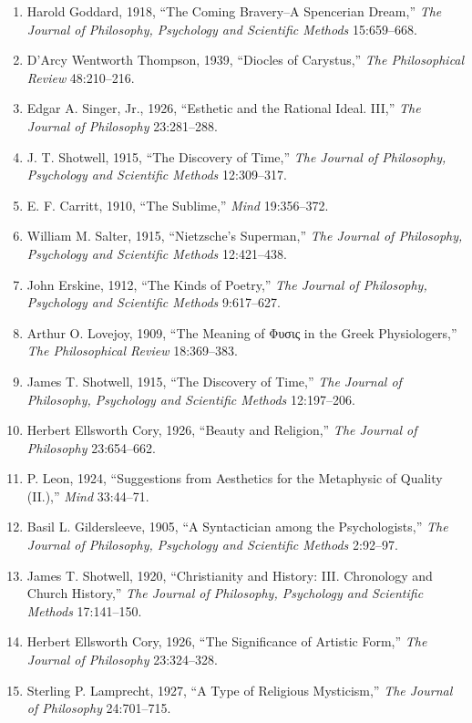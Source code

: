 \documentclass[
]{article}
\begin{document}
\begin{enumerate}
\def\labelenumi{\arabic{enumi}.}
\item
  Harold Goddard, 1918, ``The Coming Bravery--A Spencerian Dream,''
  \emph{The Journal of Philosophy, Psychology and Scientific Methods}
  15:659--668.
\item
  D'Arcy Wentworth Thompson, 1939, ``Diocles of Carystus,'' \emph{The
  Philosophical Review} 48:210--216.
\item
  Edgar A. Singer, Jr., 1926, ``Esthetic and the Rational Ideal. III,''
  \emph{The Journal of Philosophy} 23:281--288.
\item
  J. T. Shotwell, 1915, ``The Discovery of Time,'' \emph{The Journal of
  Philosophy, Psychology and Scientific Methods} 12:309--317.
\item
  E. F. Carritt, 1910, ``The Sublime,'' \emph{Mind} 19:356--372.
\item
  William M. Salter, 1915, ``Nietzsche's Superman,'' \emph{The Journal
  of Philosophy, Psychology and Scientific Methods} 12:421--438.
\item
  John Erskine, 1912, ``The Kinds of Poetry,'' \emph{The Journal of
  Philosophy, Psychology and Scientific Methods} 9:617--627.
\item
  Arthur O. Lovejoy, 1909, ``The Meaning of Φυσις in the Greek
  Physiologers,'' \emph{The Philosophical Review} 18:369--383.
\item
  James T. Shotwell, 1915, ``The Discovery of Time,'' \emph{The Journal
  of Philosophy, Psychology and Scientific Methods} 12:197--206.
\item
  Herbert Ellsworth Cory, 1926, ``Beauty and Religion,'' \emph{The
  Journal of Philosophy} 23:654--662.
\item
  P. Leon, 1924, ``Suggestions from Aesthetics for the Metaphysic of
  Quality (II.),'' \emph{Mind} 33:44--71.
\item
  Basil L. Gildersleeve, 1905, ``A Syntactician among the
  Psychologists,'' \emph{The Journal of Philosophy, Psychology and
  Scientific Methods} 2:92--97.
\item
  James T. Shotwell, 1920, ``Christianity and History: III. Chronology
  and Church History,'' \emph{The Journal of Philosophy, Psychology and
  Scientific Methods} 17:141--150.
\item
  Herbert Ellsworth Cory, 1926, ``The Significance of Artistic Form,''
  \emph{The Journal of Philosophy} 23:324--328.
\item
  Sterling P. Lamprecht, 1927, ``A Type of Religious Mysticism,''
  \emph{The Journal of Philosophy} 24:701--715.
\end{enumerate}
\end{document}
